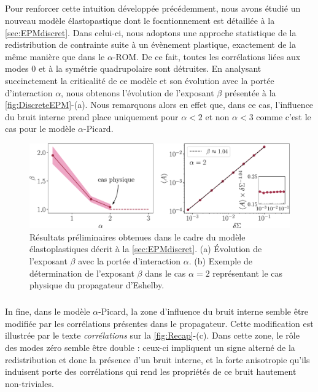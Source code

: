 \subparagraph{}Pour renforcer cette intuition développée précédemment, nous avons étudié un nouveau modèle élastopastique dont le focntionnement est détaillée à la \autoref{sec:EPMdiscret}. Dans celui-ci, nous adoptons une approche statistique de la redistribution de contrainte suite à un évènement plastique, exactement de la même manière que dans le $\alpha$-ROM. De ce fait, toutes les corrélations liées aux modes 0 et à la symétrie quadrupolaire sont détruites. En analysant succinctement la criticalité de ce modèle et son évolution avec la portée d’interaction $\alpha$, nous obtenons l'évolution de l'exposant $\beta$ présentée à la \autoref{fig:DiscreteEPM}-(a). Nous remarquons alors en effet que, dans ce cas, l'influence du bruit interne prend place uniquement pour $\alpha < 2$ et non $\alpha < 3$ comme c'est le cas pour le modèle $\alpha$-Picard.

\begin{figure}[h]
	\centering
	\includegraphics[width=\textwidth]{Chapitre5/Figures/DiscreteEPM.pdf}
	\caption{Résultats préliminaires obtenues dans le cadre du modèle élastoplastiques décrit à la \autoref{sec:EPMdiscret}. (a) Évolution de l'exposant $\beta$ avec la portée d'interaction $\alpha$. (b) Exemple de détermination de l'exposant $\beta$ dans le cas $\alpha = 2$ représentant le cas physique du propagateur d'Eshelby.}
	\label{fig:DiscreteEPM}
\end{figure}

\subparagraph{}In fine, dans le modèle $\alpha$-Picard, la zone d'influence du bruit interne semble être modifiée par les corrélations présentes dans le propagateur. Cette modification est illustrée par le texte \textit{corrélations} sur la \autoref{fig:Recap}-(c). Dans cette zone, le rôle des modes zéro semble être double : ceux-ci impliquent un signe alterné de la redistribution et donc la présence d'un bruit interne, et la forte anisotropie qu'ils induisent porte des corrélations qui rend les propriétés de ce bruit hautement non-triviales.

